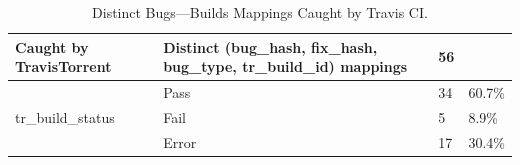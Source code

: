 \documentclass[10pt,conference]{IEEEtran}
\begin{document}
\begin{table}[t]
\centering
\begin{tabular}{llll}
\hline
Caught by TravisTorrent            & Distinct (bug\_hash, fix\_hash, bug\_type, tr\_build\_id) mappings & 56 &        \\ \hline
\multirow{3}{*}{tr\_build\_status} & Pass                                                               & 34 & 60.7\% \\
                                   & Fail                                                               & 5  & 8.9\%  \\
                                   & Error                                                              & 17 & 30.4\% \\ \hline
\end{tabular}
\caption{Distinct Bugs---Builds Mappings Caught by Travis CI. }
\label{tab:buildstatus}
\end{table}

\end{document}
